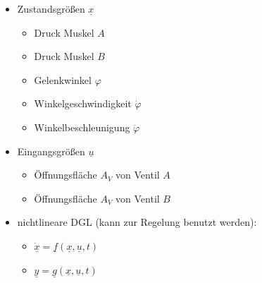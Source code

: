 \begin{itemize}
\item Zustandsgrößen $\underline{x}$
\begin{itemize}
\item Druck Muskel $A$
\item Druck Muskel $B$
\item Gelenkwinkel $\varphi$
\item Winkelgeschwindigkeit $\dot{\varphi}$
\item Winkelbeschleunigung $\ddot{\varphi}$
\end{itemize}
\item Eingangsgrößen $\underline{u}$
\begin{itemize}
\item Öffnungsfläche $A_V$ von Ventil $A$
\item Öffnungsfläche $A_V$ von Ventil $B$
\end{itemize}
\item nichtlineare DGL (kann zur Regelung benutzt werden):
\begin{itemize}
\item[] $\underline{\dot{x}} = \underline{f}(\underline{x}, \underline{u}, t)$
\item[] $\underline{y} = \underline{g}(\underline{x}, \underline{u}, t)$
\end{itemize}
\end{itemize}
